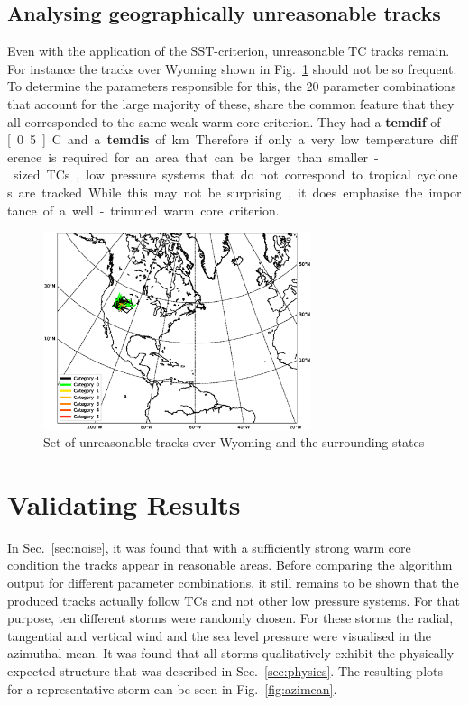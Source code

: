 \subsection*{Analysing geographically unreasonable tracks}
Even with the application of the SST-criterion, unreasonable TC tracks remain. For instance the tracks over Wyoming shown in Fig.~\ref{fig:rogue-tracks} should not be so frequent. To determine the parameters responsible for this, the 20 parameter combinations that account for the large majority of these, share the common feature that they all corresponded to the same weak warm core criterion. They had a \textbf{temdif} of \unit[0.5]{\degree C} and a \textbf{temdis} of \unit[400]{km}. Therefore if only a very low temperature difference is required for an area that can be larger than smaller-sized TCs, low pressure systems that do not correspond to tropical cyclones are tracked. While this may not be surprising, it does emphasise the importance of a well-trimmed warm core criterion.
\begin{figure}[ht]
	\centering
	\includegraphics[width=0.7\textwidth]{img/rogue_tracks.eps}
	\caption{Set of unreasonable tracks over Wyoming and the surrounding states}
	\label{fig:rogue-tracks}
\end{figure}
\section{Validating Results}
In Sec.~\ref{sec:noise}, it was found that with a sufficiently strong warm core condition the tracks appear in reasonable areas. Before comparing the algorithm output for different parameter combinations, it still remains to be shown that the produced tracks actually follow TCs and not other low pressure systems. For that purpose, ten different storms were randomly chosen. For these storms the radial, tangential and vertical wind and the sea level pressure were visualised in the azimuthal mean. It was found that all storms qualitatively exhibit the physically expected structure that was described in Sec.~\ref{sec:physics}. The resulting plots for a representative storm can be seen in Fig.~\ref{fig:azimean}.

